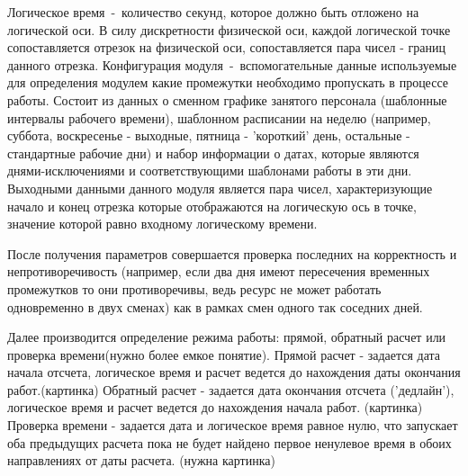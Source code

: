 Логическое время~-~количество секунд, которое должно быть отложено на логической оси. В силу дискретности физической оси, каждой логической точке сопоставляется отрезок на физической оси, сопоставляется пара чисел - границ данного отрезка.
Конфигурация модуля~-~вспомогательные данные используемые для определения модулем какие промежутки необходимо пропускать в процессе работы. Состоит из данных о сменном графике занятого персонала (шаблонные интервалы рабочего времени), шаблонном расписании на неделю (например, суббота, воскресенье - выходные, пятница - 'короткий' день, остальные - стандартные рабочие дни) и набор информации о датах, которые являются днями-исключениями и соответствующими шаблонами работы в эти дни.
\newline
Выходными данными данного модуля является пара чисел, характеризующие начало и конец отрезка которые отображаются на логическую ось в точке, значение которой равно входному логическому времени.

После получения параметров совершается проверка последних на корректность и непротиворечивость (например, если два дня имеют пересечения временных промежутков то они противоречивы, ведь ресурс не может работать одновременно в двух сменах) как в рамках смен одного так соседних дней.

Далее производится определение режима работы: прямой, обратный расчет или проверка времени(нужно более емкое понятие).
Прямой расчет - задается дата начала отсчета, логическое время и расчет ведется до нахождения даты окончания работ.(картинка)
Обратный расчет - задается дата окончания отсчета ('дедлайн'), логическое время и расчет ведется до нахождения начала работ. (картинка)
Проверка времени - задается дата и логическое время равное нулю, что запускает оба предыдущих расчета пока не будет найдено первое ненулевое время в обоих направлениях от даты расчета. (нужна картинка)

